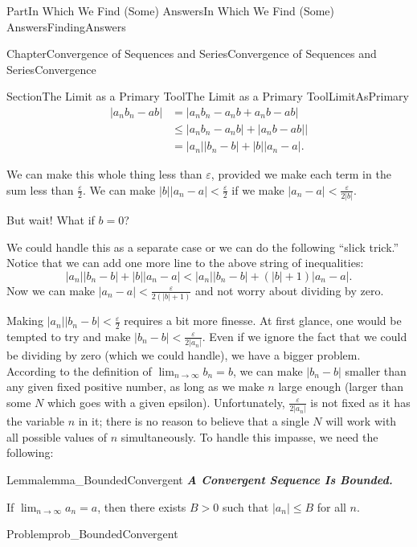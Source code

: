 \documentclass[oneside,10pt,]{book}
\newcommand{\alert}[1]{\textbf{\textit{#1}}}
\numberwithin{equation}{part}
\newcommand{\abs}[1]{\left|#1\right|}
\def\limitt#1#2#3{{\displaystyle\lim_{#1\rightarrow #2}\textstyle #3}}
\newcommand{\eps}{\varepsilon}
\newcommand{\lt}{<}
\newcommand{\amp}{&}
\begin{document}
\begin{partptx}{Part}{In Which We Find (Some) Answers}{}{In Which We Find (Some) Answers}{}{}{FindingAnswers}
\begin{chapterptx}{Chapter}{Convergence of Sequences and Series}{}{Convergence of Sequences and Series}{}{}{Convergence}
\begin{sectionptx}{Section}{The Limit as a Primary Tool}{}{The Limit as a Primary Tool}{}{}{LimitAsPrimary}
\begin{align*}
\abs{a_n  b_n-a  b}\amp =\abs{a_n  b_n-a_n b+a_n b-a  b}\\
\amp \leq \abs{a_n  b_n-a_n  b}+\abs{a_n b-a b}|\\
\amp =\abs{a_n}\abs{b_n-b}+\abs{b}\abs{a_n-a}\text{.}
\end{align*}
%
\par
We can make this whole thing less than \(\eps\), provided we make each term in the sum less than \(\frac{\eps}{2}\).  We can make \(\big|b\big|\big|a_n-a\big|\lt \frac{\eps}{2}\) if we make \(\big|a_n-a\big|\lt \frac{\eps}{2|b|}\).%
\par
But wait! What if \(b=0\)?%
\par
We could handle this as a separate case or we can do the following ``slick trick.'' Notice that we can add one more line to the above string of inequalities:%
\begin{equation*}
\left|a_n\right|\left|b_n-b\right|+\left|b\right|\left|a_n-a\right|\lt
\left|a_n
\right|\left|b_n-b\right|+\left(\left|b\right|+1\right)\left|a_n-a
\right|\text{.}
\end{equation*}
Now we can make \(\left|a_n-a\right|\lt
\frac{\eps}{2\left(|b|+1\right)}\) and not worry about dividing by zero.%
\par
Making \(\abs{a_n}\abs{b_n-b}\lt \frac{\eps}{2}\) requires a bit more finesse. At first glance, one would be tempted to try and make \(\abs{b_n-b}\lt \frac{\eps}{2|a_n|}\). Even if we ignore the fact that we could be dividing by zero (which we could handle), we have a bigger problem. According to the definition of \(\limitt{n}{\infty}{b_n}=b\), we can make \(\abs{b_n-b}\) smaller than any given fixed positive number, as long as we make \(n\) large enough (larger than some \(N\) which goes with a given epsilon). Unfortunately, \(\frac{\eps}{2|a_n|}\) is not fixed as it has the variable \(n\) in it; there is no reason to believe that a single \(N\) will work with all possible values of \(n\) simultaneously. To handle this impasse, we need the following:%
\begin{lemma}{Lemma}{}{}{lemma_BoundedConvergent}%
%
\alert{A Convergent Sequence Is Bounded.}%
\par
If \(\limitt{n}{\infty}{a_n}=a\), then there exists \(B>0\) such that \(\abs{a_n}\leq B\) for all \(n\).%
\end{lemma}
\begin{problem}{Problem}{}{prob_BoundedConvergent}%

\end{problem}
\end{sectionptx}
\end{chapterptx}
\end{partptx}
\end{document}
